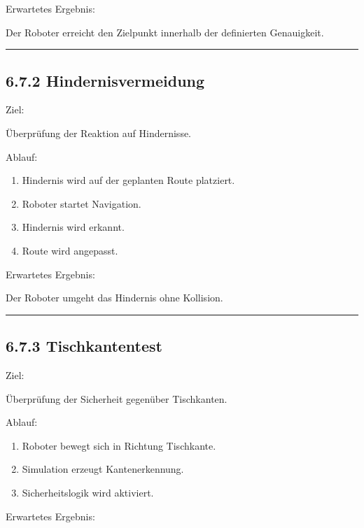 \documentclass[
  a4paper,
  12pt,
  DIV=12,        %
  parskip=half,  %
  headings=small %
]{scrartcl}
\theoremstyle{definition}
\providecommand{\tightlist}{%
  \setlength{\itemsep}{0pt}\setlength{\parskip}{0pt}}
\theoremstyle{definition}
\providecommand{\tightlist}{%
  \setlength{\itemsep}{0pt}\setlength{\parskip}{0pt}}
\begin{document}
Erwartetes Ergebnis:

Der Roboter erreicht den Zielpunkt innerhalb der definierten
Genauigkeit.

\begin{center}\rule{0.5\linewidth}{0.5pt}\end{center}

\subsection{6.7.2 Hindernisvermeidung}\label{hindernisvermeidung}

Ziel:

Überprüfung der Reaktion auf Hindernisse.

Ablauf:

\begin{enumerate}
\def\labelenumi{\arabic{enumi}.}
\tightlist
\item
  Hindernis wird auf der geplanten Route platziert.
\item
  Roboter startet Navigation.
\item
  Hindernis wird erkannt.
\item
  Route wird angepasst.
\end{enumerate}

Erwartetes Ergebnis:

Der Roboter umgeht das Hindernis ohne Kollision.

\begin{center}\rule{0.5\linewidth}{0.5pt}\end{center}

\subsection{6.7.3 Tischkantentest}\label{tischkantentest}

Ziel:

Überprüfung der Sicherheit gegenüber Tischkanten.

Ablauf:

\begin{enumerate}
\def\labelenumi{\arabic{enumi}.}
\tightlist
\item
  Roboter bewegt sich in Richtung Tischkante.
\item
  Simulation erzeugt Kantenerkennung.
\item
  Sicherheitslogik wird aktiviert.
\end{enumerate}

Erwartetes Ergebnis:
\end{document}
